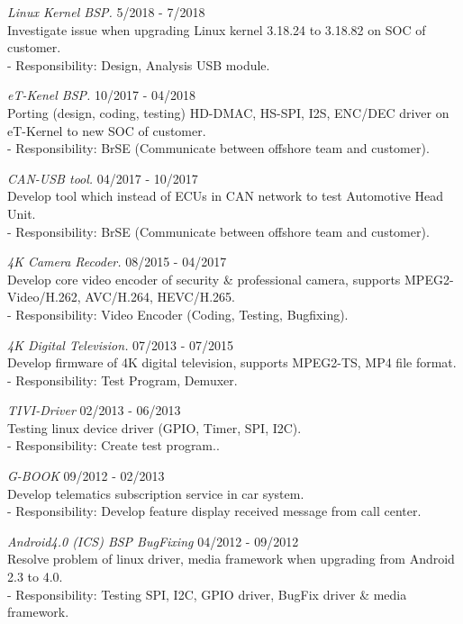 \documentclass[margin]{res}
\begin{document}
\begin{resume}
                {\sl Linux Kernel BSP.} \hfill            5/2018 - 7/2018 \\
		 Investigate issue when upgrading Linux kernel 3.18.24 to 3.18.82 on SOC of customer.\\
		 - Responsibility: Design, Analysis USB module.

                {\sl eT-Kenel BSP.} \hfill            10/2017 - 04/2018 \\
		 Porting (design, coding, testing) HD-DMAC, HS-SPI, I2S, ENC/DEC driver on eT-Kernel to new SOC of customer.\\
		 - Responsibility: BrSE (Communicate between offshore team and customer).


                {\sl CAN-USB tool.} \hfill            04/2017 - 10/2017 \\
		 Develop tool which instead of ECUs in CAN network to test Automotive Head Unit.\\
		 - Responsibility: BrSE (Communicate between offshore team and customer).

                {\sl 4K Camera Recoder.} \hfill            08/2015 - 04/2017 \\
		 Develop core video encoder of security \& professional camera, supports MPEG2-Video/H.262, AVC/H.264, HEVC/H.265.\\
		 - Responsibility: Video Encoder (Coding, Testing, Bugfixing).
   

                {\sl 4K Digital Television.} \hfill            07/2013 - 07/2015 \\
		 Develop firmware of 4K digital television, supports MPEG2-TS, MP4 file format.\\
		 - Responsibility: Test Program, Demuxer.

                {\sl TIVI-Driver} \hfill            02/2013 - 06/2013 \\
		 Testing linux device driver (GPIO, Timer, SPI, I2C).\\
		 - Responsibility: Create test program..

                {\sl G-BOOK} \hfill            09/2012 - 02/2013 \\
		 Develop telematics subscription service in car system.\\
		 - Responsibility: Develop feature display received message from call center.


                {\sl Android4.0 (ICS) BSP BugFixing} \hfill            04/2012 - 09/2012\\
		 Resolve problem of linux driver, media framework when upgrading from Android 2.3 to 4.0.\\
		 - Responsibility: Testing SPI, I2C, GPIO driver, BugFix driver \& media framework.



\end{resume}
\end{document}
